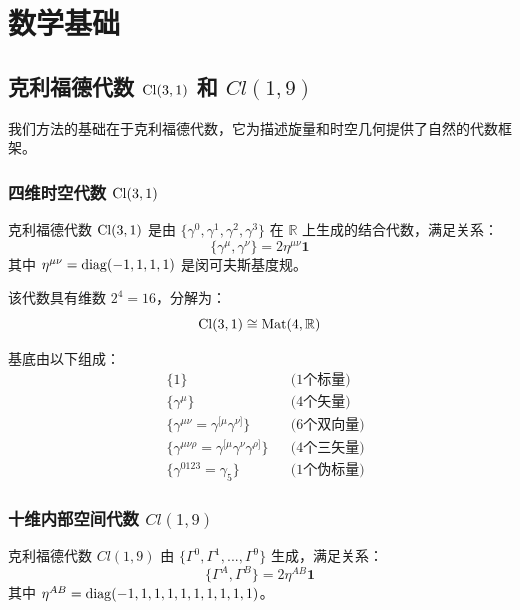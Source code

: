 \section{数学基础}
\label{sec:math}

\subsection{克利福德代数 $\Cl(3,1)$ 和 $Cl(1,9)$}

我们方法的基础在于克利福德代数，它为描述旋量和时空几何提供了自然的代数框架。

\subsubsection{四维时空代数 $\Cl(3,1)$}

\begin{definition}[克利福德代数 $\Cl(3,1)$]
克利福德代数 $\Cl(3,1)$ 是由 $\{\gamma^0, \gamma^1, \gamma^2, \gamma^3\}$ 在 $\mathbb{R}$ 上生成的结合代数，满足关系：
\begin{equation}
    \{\gamma^\mu, \gamma^\nu\} = 2\eta^{\mu\nu} \mathbf{1}
\end{equation}
其中 $\eta^{\mu\nu} = \mathrm{diag}(-1, 1, 1, 1)$ 是闵可夫斯基度规。
\end{definition}

该代数具有维数 $2^4 = 16$，分解为：
\begin{equation}
    \mathrm{Cl}(3,1) \cong \text{Mat}(4, \mathbb{R})
\end{equation}

基底由以下组成：
\begin{align}
    &\{1\} && \text{(1个标量)} \\
    &\{\gamma^\mu\} && \text{(4个矢量)} \\
    &\{\gamma^{\mu\nu} = \gamma^{[\mu}\gamma^{\nu]}\} && \text{(6个双向量)} \\
    &\{\gamma^{\mu\nu\rho} = \gamma^{[\mu}\gamma^\nu\gamma^{\rho]}\} && \text{(4个三矢量)} \\
    &\{\gamma^{0123} = \gamma_5\} && \text{(1个伪标量)}
\end{align}

\subsubsection{十维内部空间代数 $Cl(1,9)$}

\begin{definition}[克利福德代数 $Cl(1,9)$]
克利福德代数 $Cl(1,9)$ 由 $\{\Gamma^0, \Gamma^1, ..., \Gamma^9\}$ 生成，满足关系：
\begin{equation}
    \{\Gamma^A, \Gamma^B\} = 2\eta^{AB} \mathbf{1}
\end{equation}
其中 $\eta^{AB} = \mathrm{diag}(-1, 1, 1, 1, 1, 1, 1, 1, 1, 1)$。
\end{definition}


